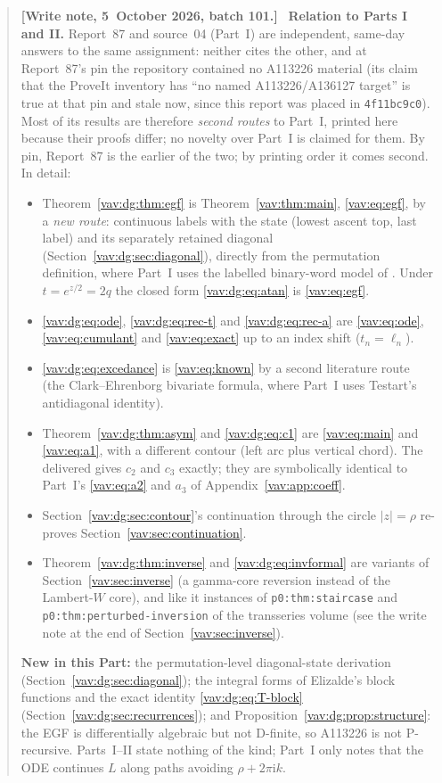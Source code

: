 \documentclass[11pt]{article}
\theoremstyle{remark}\newtheorem{remark}[theorem]{Remark}
\newcommand{\ii}{\mathrm i}
\newenvironment{writenoteb}{\begin{quote}\small\raggedright\textbf{[Write note, 5~October 2026, batch 101.]}\ }{\end{quote}}
\begin{document}
\begin{writenoteb}
\textbf{Relation to Parts I and II.} Report~87 and source~04 (Part~I) are
independent, same-day answers to the same assignment: neither cites the
other, and at Report~87's pin the repository contained no A113226 material
(its claim that the ProveIt inventory has ``no named A113226/A136127
target'' is true at that pin and stale now, since this report was placed in
\texttt{4f11bc9c0}). Most of its results are therefore \emph{second routes}
to Part~I, printed here because their proofs differ; no novelty over Part~I
is claimed for them. By pin, Report~87 is the earlier of the two; by
printing order it comes second. In detail:
\begin{itemize}
\item Theorem~\ref{vav:dg:thm:egf} is Theorem~\ref{vav:thm:main},
\eqref{vav:eq:egf}, by a \emph{new route}: continuous labels with the
state (lowest ascent top, last label) and its separately retained diagonal
(Section~\ref{vav:dg:sec:diagonal}), directly from the permutation
definition, where Part~I uses the labelled binary-word model of
\cite[Proposition~7]{bck}. Under $t=e^{z/2}=2q$ the closed form
\eqref{vav:dg:eq:atan} is \eqref{vav:eq:egf}.
\item \eqref{vav:dg:eq:ode}, \eqref{vav:dg:eq:rec-t} and
\eqref{vav:dg:eq:rec-a} are \eqref{vav:eq:ode}, \eqref{vav:eq:cumulant} and
\eqref{vav:eq:exact} up to an index shift ($t_n=\ell_n$).
\item \eqref{vav:dg:eq:excedance} is \eqref{vav:eq:known} by a second
literature route (the Clark--Ehrenborg bivariate formula, where Part~I
uses Testart's antidiagonal identity).
\item Theorem~\ref{vav:dg:thm:asym} and \eqref{vav:dg:eq:c1} are
\eqref{vav:eq:main} and \eqref{vav:eq:a1}, with a different contour (left
arc plus vertical chord). The delivered 
gives $c_2$ and $c_3$ exactly; they are symbolically identical to Part~I's
\eqref{vav:eq:a2} and $a_3$ of Appendix~\ref{vav:app:coeff}.
\item Section~\ref{vav:dg:sec:contour}'s continuation through the circle
$|z|=\rho$ re-proves Section~\ref{vav:sec:continuation}.
\item Theorem~\ref{vav:dg:thm:inverse} and \eqref{vav:dg:eq:invformal} are
variants of Section~\ref{vav:sec:inverse} (a gamma-core reversion instead of
the Lambert-$W$ core), and like it instances of \texttt{p0:thm:staircase}
and \texttt{p0:thm:perturbed-inversion} of the transseries volume (see the
write note at the end of Section~\ref{vav:sec:inverse}).
\end{itemize}
\textbf{New in this Part:} the permutation-level diagonal-state derivation
(Section~\ref{vav:dg:sec:diagonal}); the integral forms of Elizalde's block
functions and the exact identity \eqref{vav:dg:eq:T-block}
(Section~\ref{vav:dg:sec:recurrences}); and
Proposition~\ref{vav:dg:prop:structure}: the EGF is differentially
algebraic but not D-finite, so A113226 is not P-recursive. Parts~I--II
state nothing of the kind; Part~I only notes that the ODE continues $L$
along paths avoiding $\rho+2\pi\ii k$.


\end{writenoteb}
\end{document}
